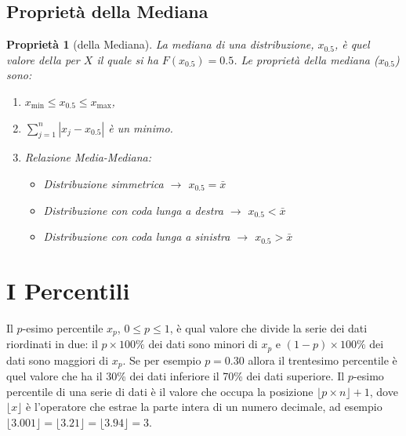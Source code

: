 \documentclass[
  11pt,
]{book}
\providecommand{\tightlist}{%
  \setlength{\itemsep}{0pt}\setlength{\parskip}{0pt}}
\theoremstyle{mytheoremstyle}
\newtheorem{proposition}{Proprietà}[section]
\theoremstyle{mydefstyle}
\begin{document}
\subsection{Proprietà della Mediana}\label{proprietuxe0-della-mediana}

\begin{proposition}[della Mediana]

La mediana di una distribuzione, \(x_{0.5}\), è quel valore della per
\(X\) il quale si ha \(F(x_{0.5}) = 0.5\). Le proprietà della mediana
(\(x_{0.5}\)) sono:

\begin{enumerate}
\def\labelenumi{\arabic{enumi}.}
\tightlist
\item
  \(x_{\min} \leq x_{0.5} \leq x_{\max}\),
\item
  \(\sum_{j=1}^{n} |x_{j} - x_{0.5}|\) è un minimo.
\item
  Relazione Media-Mediana:

  \begin{itemize}
  \tightlist
  \item
    Distribuzione simmetrica \(\rightarrow\) \(x_{0.5} = \bar{x}\)
  \item
    Distribuzione con coda lunga a destra \(\rightarrow\) \(x_{0.5} < \bar{x}\)
  \item
    Distribuzione con coda lunga a sinistra \(\rightarrow\) \(x_{0.5} > \bar{x}\)
  \end{itemize}
\end{enumerate}

\end{proposition}

\section{I Percentili}\label{i-percentili}

Il \(p\)-esimo percentile \(x_p\), \(0\leq p\leq 1\), è qual valore che divide la serie dei dati riordinati in due: il \(p\times100\%\) dei dati sono minori di \(x_p\) e \((1-p)\times100\%\) dei dati sono maggiori di \(x_p\).
Se per esempio \(p=0.30\) allora il trentesimo percentile è quel valore che ha il 30\% dei dati inferiore il 70\% dei dati superiore.
Il \(p\)-esimo percentile di una serie di dati è il valore che occupa la posizione \(\lfloor {p\times n}\rfloor+1\), dove \(\lfloor x\rfloor\) è l'operatore che estrae la parte intera di un numero decimale, ad esempio \(\lfloor 3.001\rfloor=\lfloor 3.21\rfloor=\lfloor 3.94\rfloor=3\).
\end{document}
